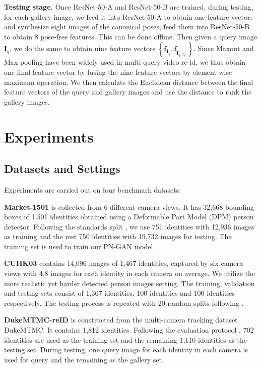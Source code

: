 \documentclass[10pt,letterpaper,twocolumn,10pt,letterpaper,twocolumn]{article}
\begin{document}
\noindent \textbf{Testing stage. } Once ResNet-50-A and ResNet-50-B
are trained, during testing, for each gallery image, we feed it into
ResNet-50-A to obtain one feature vector; and synthesize eight images
of the canonical poses, feed them into ResNet-50-B to obtain 8 pose-free
features. This can be done offline. Then given a query image $\mathbf{I}_{q}$,
we do the same to obtain nine feature vectors $\left\{ \mathbf{f}_{\mathbf{I}_{q}},\mathbf{f}_{\hat{\mathbf{I}}_{q,\mathcal{P}_{C}}}\right\} $.
Since Maxout and Max-pooling have been widely used in multi-query
video re-id, we thus obtain one final feature vector by fusing the
nine feature vectors by element-wise maximum operation. We then calculate
the Euclidean distance between the final feature vectors of the query
and gallery images and use the distance to rank the gallery images.

\section{Experiments}

\subsection{Datasets and Settings}

\noindent Experiments are carried out on four benchmark datasets: 

\noindent \noindent \textbf{Market-1501} \cite{market1501} is collected from 6
different camera views. It has 32,668 bounding boxes of 1,501 identities
obtained using a Deformable Part Model (DPM) person detector. Following
the standards split \cite{market1501}, we use 751 identities with
12,936 images as training and the rest 750 identities with 19,732
images for testing. The training set is used to train our PN-GAN model.
\textbf{ }

\noindent \noindent \textbf{CUHK03} \cite{deepreid} contains 14,096 images of
1,467 identities, captured by six camera views with 4.8 images for
each identity in each camera on average. We utilize the more realistic
yet harder detected person images setting. The training, validation
and testing sets consist of 1,367 identities, 100 identities and 100
identities respectively. The testing process is repeated with 20 random
splits following \cite{deepreid}. \textbf{ }

\noindent \noindent \textbf{DukeMTMC-reID} \cite{Duke_ori_data} is  constructed from the
multi-camera tracking dataset \textendash{} DukeMTMC. It contains
1,812 identities. Following the evaluation protocol \cite{zheng2017unlabeled},
702 identities are used as the training set and the remaining 1,110
identities as the testing set. During testing, one query image for
each identity in each camera is used for query and the remaining as
the gallery set. 
\end{document}
